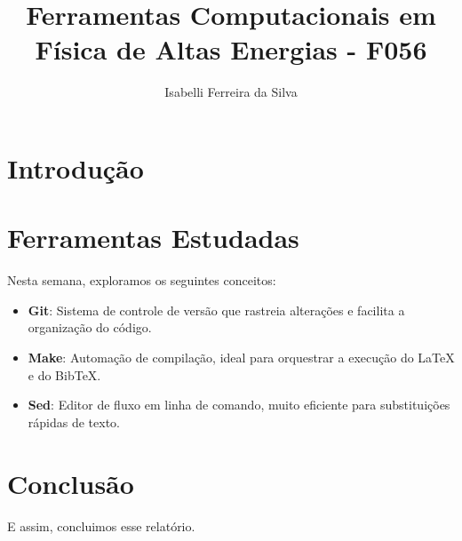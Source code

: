 \documentclass{article}
\title{Ferramentas Computacionais em Física de Altas Energias - F056}
\author{Isabelli Ferreira da Silva}
\begin{document}
\maketitle

\section{Introdução}


\section{Ferramentas Estudadas}
Nesta semana, exploramos os seguintes conceitos:
\begin{itemize}
    \item \textbf{Git}: Sistema de controle de versão que rastreia alterações e facilita a organização do código.
    \item \textbf{Make}: Automação de compilação, ideal para orquestrar a execução do LaTeX e do BibTeX.
    \item \textbf{Sed}: Editor de fluxo em linha de comando, muito eficiente para substituições rápidas de texto.
\end{itemize}

\section{Conclusão}
E assim, concluimos esse relatório.



\end{document}
